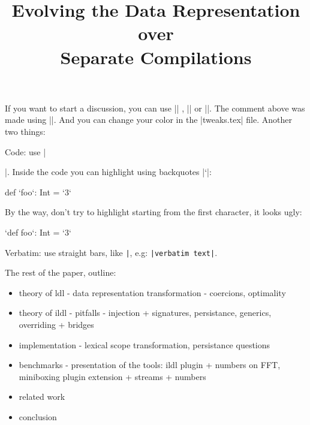 \documentclass[runningheads,a4paper]{style/llncs}
\begin{document}
\mainmatter

\title{Evolving the Data Representation over\\Separate Compilations}
\maketitle



 If you want to start a discussion, you can use || , || or ||. The comment above was made using ||. And you can change your color in the |tweaks.tex| file. Another two things:

\vspace{0.5em}

\noindent Code: use |\begin{lstlisting-nobreak}|. Inside the code you can highlight using backquotes |`|:

\begin{lstlisting-nobreak}
  def `foo`: Int = `3`
\end{lstlisting-nobreak}

\noindent By the way, don't try to highlight starting from the first character, it looks ugly:

\begin{lstlisting-nobreak}
  `def foo`: Int = `3`
\end{lstlisting-nobreak}

\noindent Verbatim: use straight bars, like \verb=|=, e.g: \verb=|verbatim text|=.

\end{lstlisting-nobreak}



The rest of the paper, outline:
\begin{itemize}
  \item theory of ldl - data representation transformation - coercions, optimality
  \item theory of ildl - pitfalls - injection + signatures, persistance, generics, overriding + bridges
  \item implementation - lexical scope transformation, persistance questions
  \item benchmarks - presentation of the tools: ildl plugin + numbers on FFT, miniboxing plugin extension + streams + numbers
  \item related work
  \item conclusion
\end{itemize}



\end{document}
